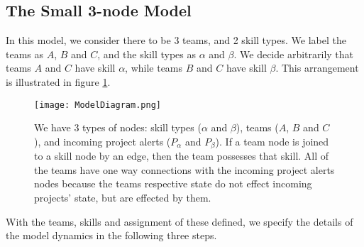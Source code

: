 \subsection{The Small 3-node Model}
\label{sec:3nodemodel}
In this model, we consider there to be 3 teams, and 2 skill types. We label the teams as $A$, $B$ and $C$, and the skill types as $\alpha$ and $\beta$. We decide arbitrarily that teams $A$ and $C$ have skill $\alpha$, while teams $B$ and $C$ have skill $\beta$. This arrangement is illustrated in figure \ref{fig:diagram1}.

\begin{figure}[ht]
	\centering

	\texttt{[image: ModelDiagram.png]}
	\caption{We have 3 types of nodes: skill types ($\alpha$ and $\beta$), teams ($A$, $B$ and $C$), and incoming project alerts ($P_\alpha$ and $P_\beta$). If a team node is joined to a skill node by an edge, then the team possesses that skill. All of the teams have one way connections with the incoming project alerts nodes because the teams respective state do not effect incoming projects' state, but are effected by them.}
	\label{fig:diagram1}
\end{figure}

With the teams, skills and assignment of these defined, we specify the details of the model dynamics in the following three steps.

